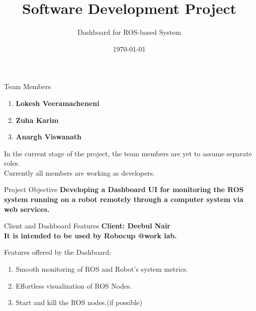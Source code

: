 \documentclass[aspectratio=169]{beamer}
\author[Dashboard for ROS-based System]{}
\title{Software Development Project}
\subtitle{Dashboard for ROS-based System}
\institute[HBRS]{Hochschule Bonn-Rhein-Sieg}
\date{\today}
\begin{document}
{
\begin{frame}
\titlepage
\end{frame}
}

\begin{frame}{Team Members}
\linespread{2}
\vspace*{-20mm}
	\begin{enumerate}
	\item \bf{Lokesh Veeramacheneni}
	\item \bf{Zuha Karim}
	\item \bf{Anargh Viswanath}
	\end{enumerate}
	\vspace*{5mm}
	In the current stage of the project, the team members are yet to assume separate roles.\\ 
\vspace*{2.5mm}	
	Currently all members are working as developers.\\
	
\end{frame}

\begin{frame}{Project Objective}
\vspace*{-15mm}
\justify \bf{Developing a Dashboard UI for monitoring the ROS system running on a robot remotely through a computer system via web services.}
\end{frame}

\begin{frame}{Client and  Dashboard Features}
\vspace*{-15mm}
\linespread{1.5}
\bf Client: \textnormal{Deebul Nair}\\
\textnormal{It is intended to be used by \bf{Robocup @work lab}.}

	\textnormal{Features offered by the Dashboard:}
	\begin{enumerate}
	\item \textnormal{Smooth monitoring of ROS and Robot's system metrics.}
	\item \textnormal{Effortless visualization of ROS Nodes.}
	\item \textnormal{Start and kill the ROS nodes.(if possible)}
	\end{enumerate}
	
\end{frame}
\end{document}
